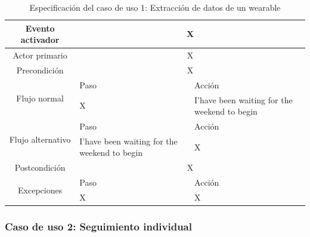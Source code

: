     \begin{table}[h]
        \centering
        \begin{tabularx}{\textwidth}{|c|X|X|}
            \hline
            Evento activador & \multicolumn{2}{|c|}{X} \\
            \hline
            Actor primario & \multicolumn{2}{|c|}{X} \\
            \hline
            Precondición & \multicolumn{2}{|c|}{X} \\
            \hline
            \multirow{2}{*}{Flujo normal} & Paso & Acción \\
            \cline{2-3} & X & I'have been waiting for the weekend to begin \\
            \hline
            \multirow{2}{*}{Flujo alternativo} & Paso & Acción \\
            \cline{2-3} & I'have been waiting for the weekend to begin & X \\
            \hline
            Postcondición & \multicolumn{2}{|c|}{X} \\
            \hline
            \multirow{2}{*}{Excepciones}  & Paso & Acción \\
            \cline{2-3} & X & X \\
            \hline
        \end{tabularx}
        \caption{Especificación del caso de uso 1: Extracción de datos de un \gls{wearable}}
        \label{tabla:caso_uso_1}
    \end{table}
    
    \subsubsection{Caso de uso 2: Seguimiento individual}

